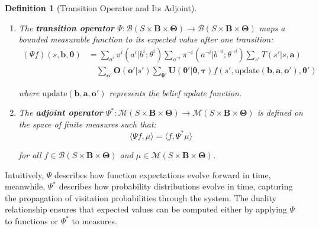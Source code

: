 \documentclass[a4paper,12pt]{report}
\newtheorem{definition}{Definition}
\begin{document}
\begin{definition}[Transition Operator and Its Adjoint]
    \hfill
    \begin{enumerate}
        \item The \textbf{transition operator}
              $\Psi: \mathcal{B}(S \times \boldsymbol{B}\times \boldsymbol{\Theta}) \to \mathcal{B}
                  (S \times \boldsymbol{B}\times \boldsymbol{\Theta})$
              maps a bounded measurable function to its expected value after one
              transition:
              \begin{align}
                  (\Psi f)(s, \boldsymbol{b}, \boldsymbol{\theta}) & = \sum_{a^i}\pi^{i}(a^{i}|b^{i}; \theta^{i}) \sum_{a^{\neg i}}\pi^{\neg i}(a^{\neg i}|b^{\neg i}; \theta^{\neg i}) \sum_{s'}T(s'|s, \boldsymbol{a})                                                                                                               \\
                                                                   & \quad \sum_{\boldsymbol{o}'}\boldsymbol{O}(\boldsymbol{o}'|s') \sum_{\boldsymbol{\theta}'}\boldsymbol{U}(\boldsymbol{\theta}'|\boldsymbol{\theta}, \boldsymbol{\tau}) f(s', \text{update}(\boldsymbol{b}, \boldsymbol{a}, \boldsymbol{o}'), \boldsymbol{\theta}')
              \end{align}

              where $\text{update}(\boldsymbol{b}, \boldsymbol{a}, \boldsymbol{o}')$
              represents the belief update function.

        \item The \textbf{adjoint operator}
              $\Psi^{*}: \mathcal{M}(S \times \boldsymbol{B}\times \boldsymbol{\Theta}) \rightarrow
                  \mathcal{M}(S \times \boldsymbol{B}\times \boldsymbol{\Theta})$
              is defined on the space of finite measures such that:
              \begin{equation}
                  \langle \Psi f, \mu \rangle = \langle f, \Psi^{*} \mu \rangle
              \end{equation}

              for all
              $f \in \mathcal{B}(S \times \boldsymbol{B}\times \boldsymbol{\Theta})$ and
              $\mu \in \mathcal{M}(S \times \boldsymbol{B}\times \boldsymbol{\Theta})$.
    \end{enumerate}
\end{definition}

Intuitively, $\Psi$ describes how function expectations evolve forward in time,
meanwhile, $\Psi^{*}$ describes how probability distributions evolve in time,
capturing the propagation of visitation probabilities through the system. The duality
relationship ensures that expected values can be computed either by applying $\Psi$
to functions or $\Psi^{*}$ to measures.
\end{document}
